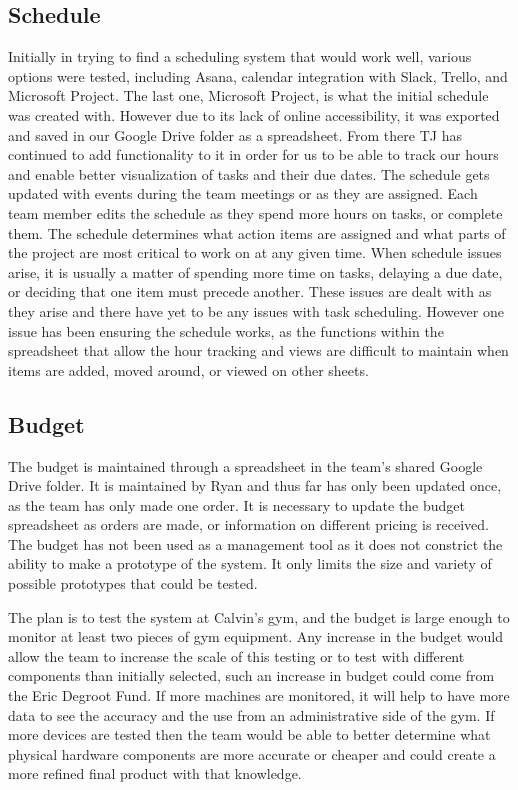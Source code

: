 \documentclass[PPFS.tex]{template/subfiles}
\begin{document}
    \subsection{Schedule}
	Initially in trying to find a scheduling system that would work well, various options were tested, including Asana, calendar integration with Slack, Trello, and Microsoft Project. The last one, Microsoft Project, is what the initial schedule was created with. However due to its lack of online accessibility, it was exported and saved in our Google Drive folder as a spreadsheet. From there TJ has continued to add functionality to it in order for us to be able to track our hours and enable better visualization of tasks and their due dates. The schedule gets updated with events during the team meetings or as they are assigned. Each team member edits the schedule as they spend more hours on tasks, or complete them. The schedule determines what action items are assigned and what parts of the project are most critical to work on at any given time. When schedule issues arise, it is usually a matter of spending more time on tasks, delaying a due date, or deciding that one item must precede another. These issues are dealt with as they arise and there have yet to be any issues with task scheduling. However one issue has been ensuring the schedule works, as the functions within the spreadsheet that allow the hour tracking and views are difficult to maintain when items are added, moved around, or viewed on other sheets.
	
    \subsection{Budget}
    The budget is maintained through a spreadsheet in the team's shared Google Drive folder. It is maintained by Ryan and thus far has only been updated once, as the team has only made one order. It is necessary to update the budget spreadsheet as orders are made, or information on different pricing is received. The budget has not been used as a management tool as it does not constrict the ability to make a prototype of the system. It only limits the size and variety of possible prototypes that could be tested.  
    
    The plan is to test the system at Calvin's gym, and the budget is large enough to monitor at least two pieces of gym equipment. Any increase in the budget would allow the team to increase the scale of this testing or to test with different components than initially selected, such an increase in budget could come from the Eric Degroot Fund. If more machines are monitored, it will help to have more data to see the accuracy and the use from an administrative side of the gym. If more devices are tested then the team would be able to better determine what physical hardware components are more accurate or cheaper and could create a more refined final product with that knowledge. 
    
\end{document}
